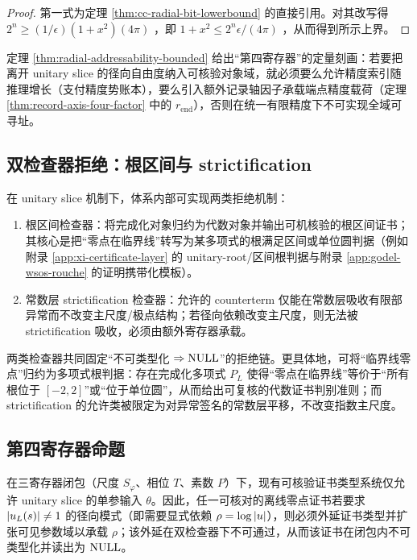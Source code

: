 \begin{proof}
第一式为定理 \ref{thm:cc-radial-bit-lowerbound} 的直接引用。对其改写得
$
2^n \ge (1/\epsilon)(1+x^2)(4\pi)
$
，即
$
1+x^2\le 2^n\epsilon/(4\pi)
$
，从而得到所示上界。
\end{proof}

\begin{remark}[第四寄存器的定量含义]
定理 \ref{thm:radial-addressability-bounded} 给出“第四寄存器”的定量刻画：若要把离开 unitary slice 的径向自由度纳入可核验对象域，就必须要么允许精度索引随推理增长（支付精度势账本），要么引入额外记录轴因子承载端点精度载荷（定理 \ref{thm:record-axis-four-factor} 中的 $r_{\mathrm{end}}$），否则在统一有限精度下不可实现全域可寻址。
\end{remark}

\subsection{双检查器拒绝：根区间与 strictification}
在 unitary slice 机制下，体系内部可实现两类拒绝机制：
\begin{enumerate}
  \item 根区间检查器：将完成化对象归约为代数对象并输出可机核验的根区间证书；其核心是把“零点在临界线”转写为某多项式的根满足区间或单位圆判据（例如附录 \ref{app:xi-certificate-layer} 的 unitary-root/区间根判据与附录 \ref{app:godel-wsos-rouche} 的证明携带化模板）。
  \item 常数层 strictification 检查器：允许的 counterterm 仅能在常数层吸收有限部异常而不改变主尺度/极点结构；若径向依赖改变主尺度，则无法被 strictification 吸收，必须由额外寄存器承载。
\end{enumerate}
两类检查器共同固定“不可类型化 $\Rightarrow \mathrm{NULL}$”的拒绝链。更具体地，可将“临界线零点”归约为多项式根判据：存在完成化多项式 $P_L$ 使得“零点在临界线”等价于“所有根位于 $[-2,2]$”或“位于单位圆”，从而给出可复核的代数证书判别准则；而 strictification 的允许类被限定为对异常签名的常数层平移，不改变指数主尺度。

\subsection{第四寄存器命题}
\begin{proposition}[第四寄存器需求]\label{prop:fourth-register-need}
在三寄存器闭包（尺度 $S_\varphi$、相位 $T$、素数 $P$）下，现有可核验证书类型系统仅允许 unitary slice 的单参输入 $\theta$。因此，任一可核对的离线零点证书若要求 $\left\lvert u_L(s)\right\rvert\neq 1$ 的径向模式（即需要显式依赖 $\rho=\log\left\lvert u\right\rvert$），则必须外延证书类型并扩张可见参数域以承载 $\rho$；该外延在双检查器下不可通过，从而该证书在闭包内不可类型化并读出为 $\mathrm{NULL}$。
\end{proposition}

